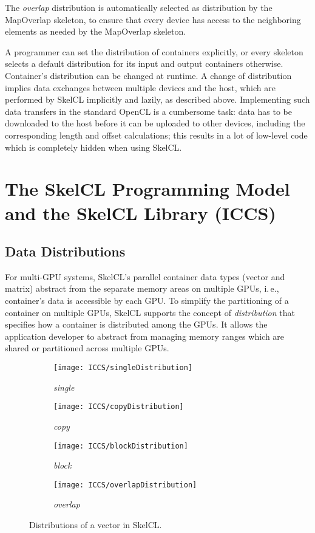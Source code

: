 The \emph{overlap} distribution is automatically selected as distribution by the MapOverlap skeleton, to ensure that every device has access to the neighboring elements as needed by the MapOverlap skeleton.

A programmer can set the distribution of containers explicitly, or every skeleton selects a default distribution for its input and output containers otherwise.
Container's distribution can be changed at runtime.
A change of distribution implies data exchanges between multiple devices and the host, which are performed by SkelCL implicitly and lazily, as described above.
Implementing such data transfers in the standard OpenCL is a cumbersome task:
data has to be downloaded to the host before it can be uploaded to other devices, including the corresponding length and offset calculations;
this results in a lot of low-level code which is completely hidden when using SkelCL.




\section{The SkelCL Programming Model and the SkelCL Library (ICCS)}


\subsection{Data Distributions}
\label{sec:data_distribution}
For multi-GPU systems, SkelCL's parallel container data types (vector and matrix) abstract from the separate memory areas on multiple GPUs, i.\,e., container's data is accessible by each GPU.
To simplify the partitioning of a container on multiple GPUs, SkelCL supports the concept of \emph{distribution} that specifies how a container is distributed among the GPUs.
It allows the application developer to abstract from managing memory ranges which are shared or partitioned across multiple GPUs.

\begin{figure}[tb]
  \centering
  \begin{subfigure}{.22\textwidth}
    \texttt{[image: ICCS/singleDistribution]}
    \caption{\emph{single}}
    \label{fig:distributions:single}
  \end{subfigure}
  \hfill
  \begin{subfigure}{.22\textwidth}
    \texttt{[image: ICCS/copyDistribution]}
    \caption{\emph{copy}}
    \label{fig:distributions:copy}
  \end{subfigure}
  \hfill
  \begin{subfigure}{.22\textwidth}
    \texttt{[image: ICCS/blockDistribution]}
    \caption{\emph{block}}
    \label{fig:distributions:block}
  \end{subfigure}
  \hfill
  \begin{subfigure}{.22\textwidth}
    \texttt{[image: ICCS/overlapDistribution]}
    \caption{\emph{overlap}}
    \label{fig:distributions:overlap}
  \end{subfigure}
  \caption{Distributions of a vector in SkelCL.}
  \label{fig:distributions}
\end{figure}

